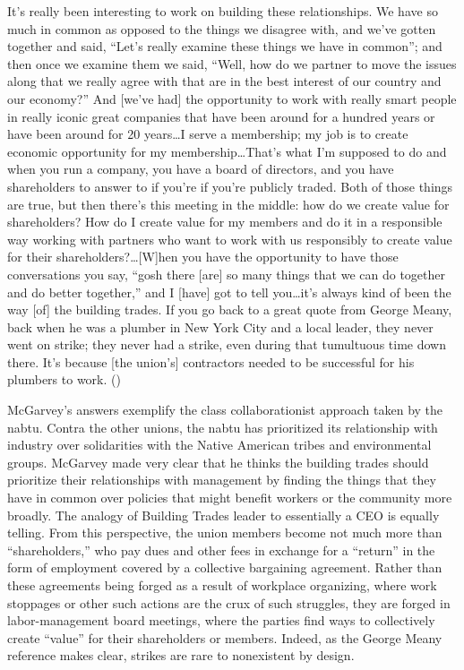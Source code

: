 \documentclass[12pt]{article}
\renewenvironment{quote}
  {\list{}{\leftmargin=\parindent\rightmargin=0pt}%
   \item\relax}
  {\endlist}
\begin{document}
\begin{quote}
It’s really been interesting to work on building these relationships. We have so much in common as opposed to the things we disagree with, and we've gotten together and said, “Let's really examine these things we have in common”; and then once we examine them we said, “Well, how do we partner to move the issues along that we really agree with that are in the best interest of our country and our economy?” And [we’ve had] the opportunity to work with really smart people in really iconic great companies that have been around for a hundred years or have been around for 20 years\ldots I serve a membership; my job is to create economic opportunity for my membership\ldots That's what I'm supposed to do and when you run a company, you have a board of directors, and you have shareholders to answer to if you're if you're publicly traded. Both of those things are true, but then there's this meeting in the middle: how do we create value for shareholders? How do I create value for my members and do it in a responsible way working with partners who want to work with us responsibly to create value for their shareholders?\ldots [W]hen you have the opportunity to have those conversations you say, “gosh there [are] so many things that we can do together and do better together,” and I [have] got to tell you\ldots it's always kind of been the way [of] the building trades. If you go back to a great quote from George Meany, back when he was a plumber in New York City and a local leader, they never went on strike; they never had a strike, even during that tumultuous time down there. It's because [the union’s] contractors needed to be successful for his plumbers to work. (\cite{natgasnowNextInfrastructureChallenge2015})
\end{quote}

McGarvey’s answers exemplify the class collaborationist approach taken by the \acrshort{nabtu}. Contra the other unions, the \acrshort{nabtu} has prioritized its relationship with industry over solidarities with the Native American tribes and environmental groups. McGarvey made very clear that he thinks the building trades should prioritize their relationships with management by finding the things that they have in common over policies that might benefit workers or the community more broadly. The analogy of Building Trades leader to essentially a CEO is equally telling. From this perspective, the union members become not much more than “shareholders,” who pay dues and other fees in exchange for a “return” in the form of employment covered by a collective bargaining agreement. Rather than these agreements being forged as a result of workplace organizing, where work stoppages or other such actions are the crux of such struggles, they are forged in labor-management board meetings, where the parties find ways to collectively create “value” for their shareholders or members. Indeed, as the George Meany reference makes clear, strikes are rare to nonexistent by design.
\end{document}
